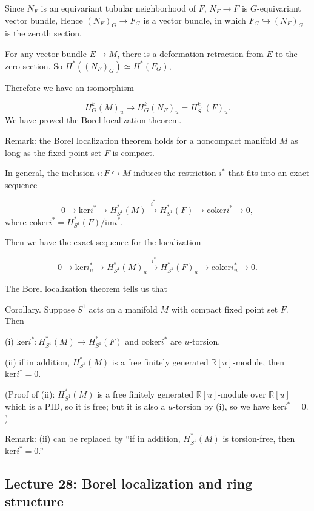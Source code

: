 \documentclass{article}
\theoremstyle{mystyle}
\theoremstyle{remark}
\numberwithin{equation}{section}
\begin{document}
Since $N_F$ is an equivariant tubular neighborhood of $F$, $N_F\rightarrow F$ is $G$-equivariant vector bundle, Hence $(N_F)_G\rightarrow F_G$ is a vector bundle, in which $F_G\hookrightarrow (N_F)_G$ is the zeroth section.

For any vector bundle $E\rightarrow M$, there is a deformation retraction from $E$ to the zero section. So $H^*((N_F)_G) \simeq H^*(F_G)$, 

Therefore we have an isomorphism

$$H^k_G(M)_u \rightarrow H^k_G(N_F)_u = H^k_{S^1}(F)_u.$$
We have proved the Borel localization theorem.

Remark: the Borel localization theorem holds for a noncompact manifold $M$ as long as the fixed point set $F$ is compact.




In general, the inclusion $i\colon F\hookrightarrow M$ induces the restriction $i^*$ that fits into an exact sequence

$$0\rightarrow \mathrm{ker}i^*\rightarrow H^*_{S^1}(M)\xrightarrow{i^*} H^*_{S^1}(F)\rightarrow \mathrm{coker}i^*\rightarrow 0,$$
where $\mathrm{coker}i^* = H^*_{S^1}(F)/\mathrm{im}i^*$. 

Then we have the exact sequence for the localization

$$0\rightarrow \mathrm{ker}i^*_u\rightarrow H^*_{S^1}(M)_u\xrightarrow{i^*} H^*_{S^1}(F)_u\rightarrow \mathrm{coker}i^*_u\rightarrow 0.$$

The Borel localization theorem tells us that

Corollary. Suppose $S^1$ acts on a manifold $M$ with compact fixed point set $F$. Then 

(i) $\mathrm{ker}i^*\colon H^*_{S^1}(M)\rightarrow H^*_{S^1}(F)$ and $\mathrm{coker}i^*$ are $u$-torsion.

(ii) if in addition, $H^*_{S^1}(M)$ is a free finitely generated $\mathbb{R}[u]$-module, then $\mathrm{ker}i^*=0$.

(Proof of (ii): $H^*_{S^1}(M)$ is a free finitely generated $\mathbb{R}[u]$-module over $\mathbb{R}[u]$ which is a PID, so it is free; but it is also a $u$-torsion by (i), so we have $\mathrm{ker}i^*=0$. )

Remark: (ii) can be replaced by ``if in addition, $H^*_{S^1}(M)$ is torsion-free, then $\mathrm{ker}i^*=0$.''



\subsection{Lecture 28: Borel localization and ring structure}
\end{document}
